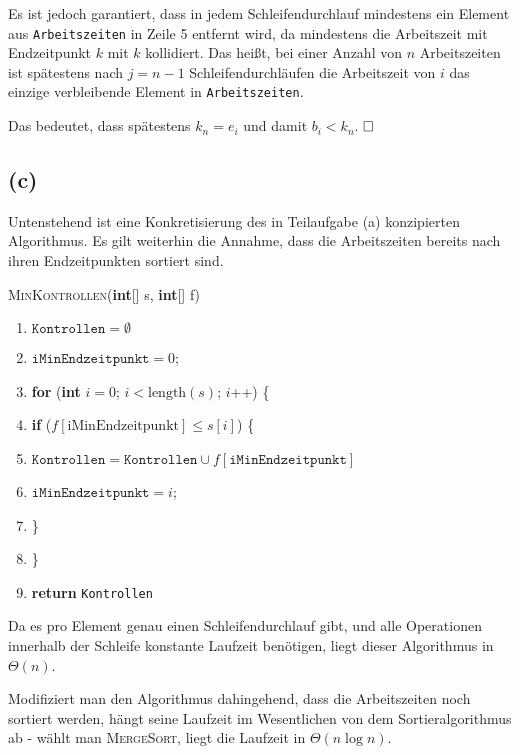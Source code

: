 \documentclass[a4paper,12pt]{article}
\begin{document}
Es ist jedoch garantiert, dass in jedem Schleifendurchlauf mindestens ein Element aus \texttt{Arbeitszeiten} in Zeile 5 entfernt wird, da mindestens die Arbeitszeit mit Endzeitpunkt $k$ mit $k$ kollidiert. Das heißt, bei einer Anzahl von $n$ Arbeitszeiten ist spätestens nach $j=n-1$ Schleifendurchläufen die Arbeitszeit von $i$ das einzige verbleibende Element in \texttt{Arbeitszeiten}. 

Das bedeutet, dass spätestens $k_n=e_i$ und damit $b_i<k_n$. \Lightning
$\hfill\square$

\subsection*{(c)}
Untenstehend ist eine Konkretisierung des in Teilaufgabe (a) konzipierten Algorithmus. Es gilt weiterhin die Annahme, dass die Arbeitszeiten bereits nach ihren Endzeitpunkten sortiert sind.
\begin{mdframed}
\textsc{MinKontrollen}(\textbf{int}[] s, \textbf{int}[] f)
\begin{enumerate}[itemsep=-1mm,label=\arabic*]
\item $\texttt{Kontrollen}=\emptyset$
\item $\texttt{iMinEndzeitpunkt}=0$;
\item \textbf{for} (\textbf{int} $i = 0$; $i < \text{length}(s)$; $i$++) \{
\item \hspace{4mm} \textbf{if} ($f[\text{iMinEndzeitpunkt}] \leq s[i]$) \{
\item \hspace{8mm} $\texttt{Kontrollen}=\texttt{Kontrollen}\cup f[\texttt{iMinEndzeitpunkt}]$
\item \hspace{8mm} $\texttt{iMinEndzeitpunkt}=i$;
\item \hspace{4mm} \}
\item \}
\item \textbf{return} \texttt{Kontrollen}
\end{enumerate}
\end{mdframed}

Da es pro Element genau einen Schleifendurchlauf gibt, und alle Operationen innerhalb der Schleife konstante Laufzeit benötigen, liegt dieser Algorithmus in $\Theta(n)$. 

Modifiziert man den Algorithmus dahingehend, dass die Arbeitszeiten noch sortiert werden, hängt seine Laufzeit im Wesentlichen von dem Sortieralgorithmus ab - wählt man \textsc{MergeSort}, liegt die Laufzeit in $\Theta(n\log n)$.
\end{document}
